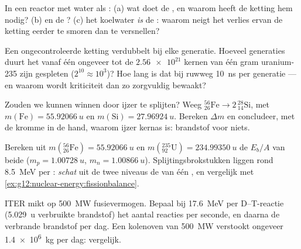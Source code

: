 \begin{exercise}[$\star\star$]\label{exo:g12:nuclear-energy:11}
In een reactor met water als : (a) wat doet de , en waarom
heeft de ketting hem nodig? (b) en de ? (c) het koelwater \emph{is}
de : waarom neigt het verlies ervan de ketting eerder te smoren dan
te versnellen?
\end{exercise}

\begin{exercise}[$\star\star\star$]\label{exo:g12:nuclear-energy:12}
Een ongecontroleerde ketting verdubbelt bij elke generatie. Hoeveel generaties
duurt het vanaf één  ongeveer tot de $\num{2.56e21}$ kernen van
één gram uranium-235 zijn gespleten ($2^{10} \approx 10^{3}$)? Hoe lang is dat
bij ruwweg \qty{10}{ns} per generatie --- en waarom wordt kriticiteit dan zo
zorgvuldig bewaakt?
\end{exercise}

\begin{exercise}[$\star\star\star$]\label{exo:g12:nuclear-energy:13}
Zouden we  kunnen winnen door ijzer te splijten? Weeg
${}^{56}_{26}\mathrm{Fe} \to 2\,{}^{28}_{14}\mathrm{Si}$, met
$m(\mathrm{Fe}) = \qty{55.92066}{u}$ en $m(\mathrm{Si}) = \qty{27.96924}{u}$.
Bereken $\Delta m$ en concludeer, met de kromme in de hand, waarom ijzer
kernas is: brandstof voor niets.
\end{exercise}

\begin{exercise}[$\star\star\star$]\label{exo:g12:nuclear-energy:14}
Bereken uit $m({}^{56}_{26}\mathrm{Fe}) = \qty{55.92066}{u}$ en
$m({}^{235}_{92}\mathrm{U}) = \qty{234.99350}{u}$ de $E_b/A$ van beide
($m_p = \qty{1.00728}{u}$, $m_n = \qty{1.00866}{u}$). Splijtingsbrokstukken
liggen rond \qty{8.5}{MeV} per : \emph{schat} uit de twee niveaus de
 van één , en vergelijk met
\cref{ex:g12:nuclear-energy:fissionbalance}.
\end{exercise}

\begin{exercise}[$\star\star\star$]\label{exo:g12:nuclear-energy:15}
ITER mikt op \qty{500}{MW} fusievermogen. Bepaal bij \qty{17.6}{MeV} per
D--T-reactie (\qty{5.029}{u} verbruikte brandstof) het aantal reacties per
seconde, en daarna de verbrande brandstof per dag. Een kolenoven van
\qty{500}{MW} verstookt ongeveer \qty{1.4e6}{kg} per dag: vergelijk.
\end{exercise}

